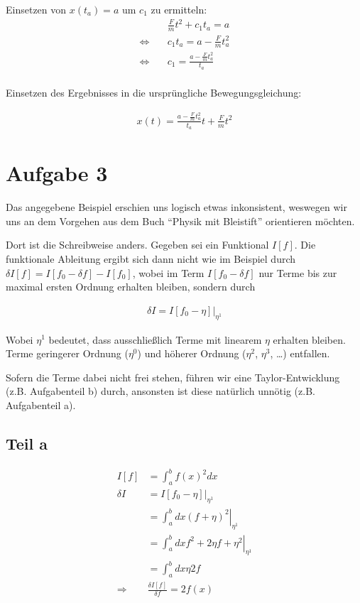 \documentclass[a4paper,german,12pt,smallheadings]{scrartcl}
\begin{document}
Einsetzen von $x(t_a) = a$ um $c_1$ zu ermitteln:
\begin{align*}
  &\frac{F}{m}t^2 + c_1t_a = a \\
  \Leftrightarrow\quad & c_1t_a = a - \frac{F}{m}t_a^2 \\
  \Leftrightarrow\quad & c_1 = \frac{a - \frac{F}{m}t_a^2}{t_a} \\
\end{align*}

Einsetzen des Ergebnisses in die ursprüngliche Bewegungsgleichung:

\begin{align*}
  x(t) = \frac{a - \frac{F}{m}t_a^2}{t_a}t + \frac{F}{m}t^2
\end{align*}

\section*{Aufgabe 3}
Das angegebene Beispiel erschien uns logisch etwas inkonsistent, weswegen wir
uns an dem Vorgehen aus dem Buch ``Physik mit Bleistift'' orientieren möchten.

Dort ist die Schreibweise anders. Gegeben sei ein Funktional $I[f]$. Die
funktionale Ableitung ergibt sich dann nicht wie im Beispiel durch $\delta I[f]
= I[f_0 - \delta f] - I[f_0]$, wobei im Term $I[f_0 - \delta f]$ nur Terme bis
zur maximal ersten Ordnung erhalten bleiben, sondern durch

\begin{align*}
  \delta I = \left.I[f_0 - \eta]\right|_{\eta^1}
\end{align*}

Wobei $\eta^1$ bedeutet, dass ausschließlich Terme mit linearem $\eta$ erhalten
bleiben. Terme geringerer Ordnung ($\eta^0$) und höherer Ordnung ($\eta^2$,
$\eta^3$, \dots) entfallen.

Sofern die Terme dabei nicht frei stehen, führen wir eine Taylor-Entwicklung
(z.B. Aufgabenteil b) durch, ansonsten ist diese natürlich unnötig (z.B.
Aufgabenteil a).

\subsection*{Teil a}

\begin{align*}
  I[f] &= \int_a^b f(x)^2 dx \\
  \delta I &= \left.I[f_0 - \eta]\right|_{\eta^1} \\
  &=\left.\int_a^b dx (f+\eta)^2 \right|_{\eta^1} \\
  &=\left.\int_a^b dx f^2 + 2 \eta f + \eta^2 \right|_{\eta^1} \\
  &=\int_a^b dx \eta 2 f \\
  \Rightarrow& \frac{\delta I[f]}{\delta f} = 2f(x)
\end{align*}
\end{document}

